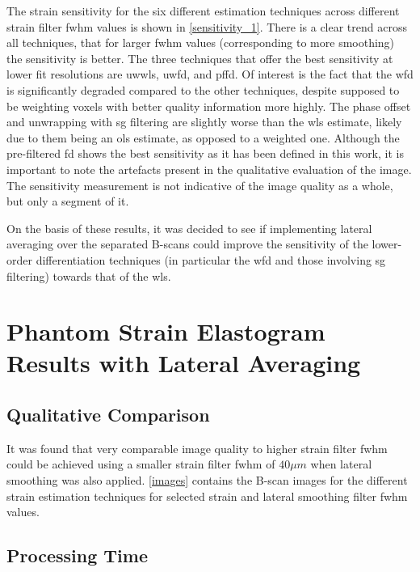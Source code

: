 The strain sensitivity for the six different estimation techniques across different strain filter \ac{fwhm} values is shown in \autoref{sensitivity_1}. There is a clear trend across all techniques, that for larger \ac{fwhm} values (corresponding to more smoothing) the sensitivity is better. 
The three techniques that offer the best sensitivity at lower fit resolutions are \ac{uwwls}, \ac{uwfd}, and \ac{pffd}. Of interest is the fact that the \ac{wfd} is significantly degraded compared to the other techniques, despite supposed to be weighting voxels with better quality information more highly.
The phase offset and unwrapping with \ac{sg} filtering are slightly worse than the \ac{wls} estimate, likely due to them being an \ac{ols} estimate, as opposed to a weighted one.
Although the pre-filtered \ac{fd} shows the best sensitivity as it has been defined in this work, it is important to note the artefacts present in the qualitative evaluation of the image. The sensitivity measurement is not indicative of the image quality as a whole, but only a segment of it.

On the basis of these results, it was decided to see if implementing lateral averaging over the separated B-scans could improve the sensitivity of the lower-order differentiation techniques (in particular the \ac{wfd} and those involving \ac{sg} filtering) towards that of the \ac{wls}. 

\section{Phantom Strain Elastogram Results with Lateral Averaging}\label{phantom_results_lateral}

\subsection{Qualitative Comparison}
It was found that very comparable image quality to higher strain filter \ac{fwhm} could be achieved using a smaller strain filter \ac{fwhm} of $40\mu m$ when lateral smoothing was also applied. \autoref{images} contains the B-scan  images for the different strain estimation techniques for selected strain and lateral smoothing filter \ac{fwhm} values. 

\subsection{Processing Time}

